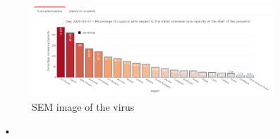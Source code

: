 \documentclass[
12pt, %
a4paper, %
oneside, %
headinclude,footinclude, %
BCOR5mm, %
]{scrartcl}
\begin{document}
\begin{figure}[H]
\begin{subfigure}{.8\textwidth}
  \caption{}
  \label{fig:Inspection_test_tracking}
\end{subfigure} 
\begin{subfigure}{.8\textwidth}
  \centering
  \includegraphics[width=1\linewidth]{Figures/Inspection_Cattura.png} 
  \caption{SEM image of the virus}
  \label{fig:Inspection_Cattura}
\end{subfigure} 
\caption{•}
\end{figure}
\end{document}
